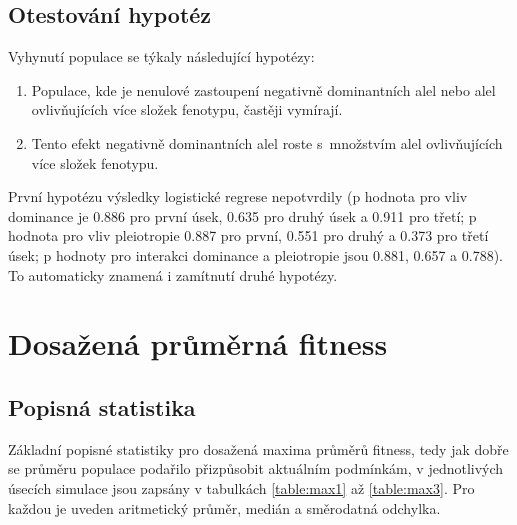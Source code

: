 \subsection{Otestování hypotéz}

Vyhynutí populace se týkaly následující hypotézy:

\begin{enumerate}
    \item{Populace, kde je nenulové zastoupení negativně dominantních alel nebo alel ovlivňujících více složek fenotypu,
          častěji vymírají.}
    \item{Tento efekt negativně dominantních alel roste s množstvím alel ovlivňujících více složek fenotypu.}
\end{enumerate}

První hypotézu výsledky logistické regrese nepotvrdily (p hodnota pro vliv dominance
je 0.886 pro první úsek,  0.635 pro druhý úsek a 0.911 pro třetí; p hodnota pro vliv pleiotropie 0.887 pro první,
0.551 pro druhý a 0.373 pro třetí úsek; p hodnoty pro interakci dominance a pleiotropie jsou 0.881, 0.657 a 0.788).
To automaticky znamená i zamítnutí druhé hypotézy.


\section{Dosažená průměrná fitness}

\subsection{Popisná statistika}

Základní popisné statistiky pro dosažená maxima průměrů fitness, tedy jak dobře se průměru populace podařilo
přizpůsobit aktuálním podmínkám, v jednotlivých úsecích simulace jsou zapsány v tabulkách \ref{table:max1}
až \ref{table:max3}. Pro každou je uveden aritmetický průměr, medián a směrodatná odchylka.


